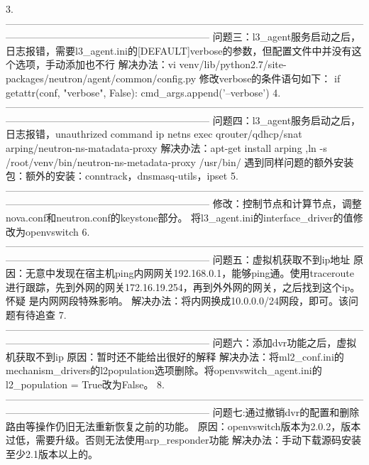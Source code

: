 \documentclass[a4paper,left=1.5cm,right=1.5cm,11pt]{article}
\begin{document}
3.--------------------------------------------------------------------------------------------------------------------------------------------------------------------------
	问题三：l3_agent服务启动之后，日志报错，需要l3_agent.ini的[DEFAULT]verbose的参数，但配置文件中并没有这个选项，手动添加也不行
	解决办法：vi venv/lib/python2.7/site-packages/neutron/agent/common/config.py  
	修改verbose的条件语句如下：
	if getattr(conf, "verbose", False):
        cmd_args.append('--verbose')
4.--------------------------------------------------------------------------------------------------------------------------------------------------------------------------
	问题四：l3_agent服务启动之后，日志报错，unauthrized command ip netns exec qrouter/qdhcp/snat arping/neutron-ns-matadata-proxy
	解决办法：apt-get install arping ,ln -s /root/venv/bin/neutron-ns-metadata-proxy /usr/bin/
	遇到同样问题的额外安装包：额外的安装：conntrack，dnsmasq-utils，ipset
5.--------------------------------------------------------------------------------------------------------------------------------------------------------------------------
	修改：控制节点和计算节点，调整nova.conf和neutron.conf的keystone部分。
	将l3_agent.ini的interface_driver的值修改为openvswitch
6.--------------------------------------------------------------------------------------------------------------------------------------------------------------------------
	问题五：虚拟机获取不到ip地址
	原因：无意中发现在宿主机ping内网网关192.168.0.1，能够ping通。使用traceroute进行跟踪，先到外网的网关172.16.19.254，再到外外网的网关，之后找到这个ip。怀疑
	是内网网段特殊影响。
	解决办法：将内网换成10.0.0.0/24网段，即可。该问题有待追查
7.--------------------------------------------------------------------------------------------------------------------------------------------------------------------------
	问题六：添加dvr功能之后，虚拟机获取不到ip
	原因：暂时还不能给出很好的解释
	解决办法：将ml2_conf.ini的mechanism_drivers的l2population选项删除。将openvswitch_agent.ini的l2_population = True改为False。
8.--------------------------------------------------------------------------------------------------------------------------------------------------------------------------
	问题七:通过撤销dvr的配置和删除路由等操作仍旧无法重新恢复之前的功能。
	原因：openvswitch版本为2.0.2，版本过低，需要升级。否则无法使用arp_responder功能
	解决办法：手动下载源码安装至少2.1版本以上的。
	
\end{document}
